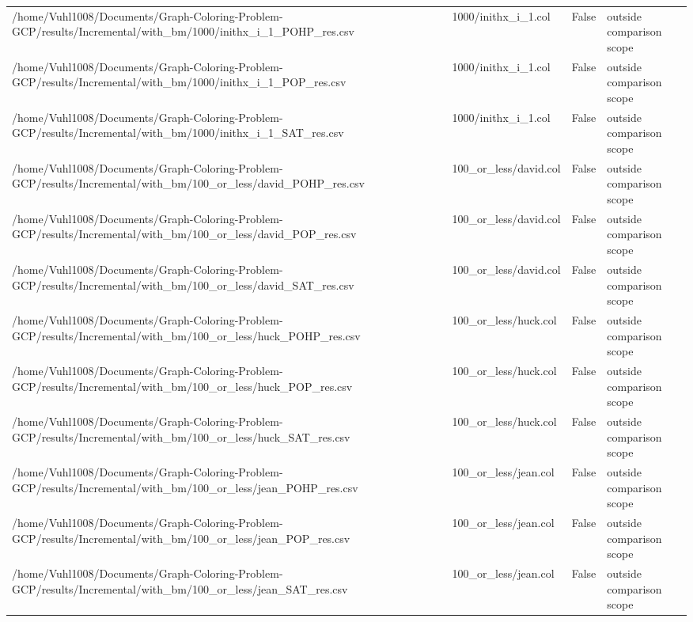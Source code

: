 \begin{table}[htbp]
\begin{tabular}{llll}
/home/Vuhl1008/Documents/Graph-Coloring-Problem-GCP/results/Incremental/with\_bm/1000/inithx\_i\_1\_POHP\_res.csv & 1000/inithx\_i\_1.col & False & outside comparison scope \\
/home/Vuhl1008/Documents/Graph-Coloring-Problem-GCP/results/Incremental/with\_bm/1000/inithx\_i\_1\_POP\_res.csv & 1000/inithx\_i\_1.col & False & outside comparison scope \\
/home/Vuhl1008/Documents/Graph-Coloring-Problem-GCP/results/Incremental/with\_bm/1000/inithx\_i\_1\_SAT\_res.csv & 1000/inithx\_i\_1.col & False & outside comparison scope \\
/home/Vuhl1008/Documents/Graph-Coloring-Problem-GCP/results/Incremental/with\_bm/100\_or\_less/david\_POHP\_res.csv & 100\_or\_less/david.col & False & outside comparison scope \\
/home/Vuhl1008/Documents/Graph-Coloring-Problem-GCP/results/Incremental/with\_bm/100\_or\_less/david\_POP\_res.csv & 100\_or\_less/david.col & False & outside comparison scope \\
/home/Vuhl1008/Documents/Graph-Coloring-Problem-GCP/results/Incremental/with\_bm/100\_or\_less/david\_SAT\_res.csv & 100\_or\_less/david.col & False & outside comparison scope \\
/home/Vuhl1008/Documents/Graph-Coloring-Problem-GCP/results/Incremental/with\_bm/100\_or\_less/huck\_POHP\_res.csv & 100\_or\_less/huck.col & False & outside comparison scope \\
/home/Vuhl1008/Documents/Graph-Coloring-Problem-GCP/results/Incremental/with\_bm/100\_or\_less/huck\_POP\_res.csv & 100\_or\_less/huck.col & False & outside comparison scope \\
/home/Vuhl1008/Documents/Graph-Coloring-Problem-GCP/results/Incremental/with\_bm/100\_or\_less/huck\_SAT\_res.csv & 100\_or\_less/huck.col & False & outside comparison scope \\
/home/Vuhl1008/Documents/Graph-Coloring-Problem-GCP/results/Incremental/with\_bm/100\_or\_less/jean\_POHP\_res.csv & 100\_or\_less/jean.col & False & outside comparison scope \\
/home/Vuhl1008/Documents/Graph-Coloring-Problem-GCP/results/Incremental/with\_bm/100\_or\_less/jean\_POP\_res.csv & 100\_or\_less/jean.col & False & outside comparison scope \\
/home/Vuhl1008/Documents/Graph-Coloring-Problem-GCP/results/Incremental/with\_bm/100\_or\_less/jean\_SAT\_res.csv & 100\_or\_less/jean.col & False & outside comparison scope \\

\end{tabular}
\end{table}
